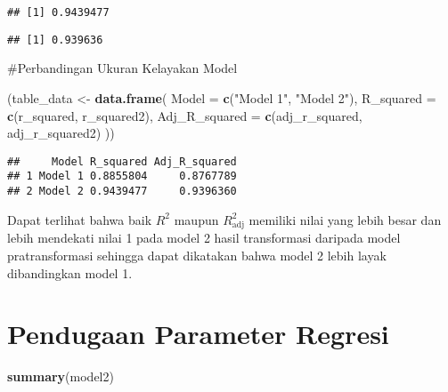 \documentclass[
]{article}
\newenvironment{Shaded}{\begin{snugshade}}{\end{snugshade}}
\newcommand{\AttributeTok}[1]{\textcolor[rgb]{0.13,0.29,0.53}{#1}}
\newcommand{\FunctionTok}[1]{\textcolor[rgb]{0.13,0.29,0.53}{\textbf{#1}}}
\newcommand{\NormalTok}[1]{#1}
\newcommand{\OtherTok}[1]{\textcolor[rgb]{0.56,0.35,0.01}{#1}}
\newcommand{\SpecialCharTok}[1]{\textcolor[rgb]{0.81,0.36,0.00}{\textbf{#1}}}
\newcommand{\StringTok}[1]{\textcolor[rgb]{0.31,0.60,0.02}{#1}}
\begin{document}
\begin{verbatim}
## [1] 0.9439477
\end{verbatim}

\begin{Shaded}
\end{Shaded}

\begin{verbatim}
## [1] 0.939636
\end{verbatim}

\#Perbandingan Ukuran Kelayakan Model

\begin{Shaded}
\begin{Highlighting}[]
\NormalTok{(table\_data }\OtherTok{\textless{}{-}} \FunctionTok{data.frame}\NormalTok{(}
  \AttributeTok{Model =} \FunctionTok{c}\NormalTok{(}\StringTok{"Model 1"}\NormalTok{, }\StringTok{"Model 2"}\NormalTok{),}
  \AttributeTok{R\_squared =} \FunctionTok{c}\NormalTok{(r\_squared, r\_squared2),}
  \AttributeTok{Adj\_R\_squared =} \FunctionTok{c}\NormalTok{(adj\_r\_squared, adj\_r\_squared2)}
\NormalTok{))}
\end{Highlighting}
\end{Shaded}

\begin{verbatim}
##     Model R_squared Adj_R_squared
## 1 Model 1 0.8855804     0.8767789
## 2 Model 2 0.9439477     0.9396360
\end{verbatim}

Dapat terlihat bahwa baik \(R^2\) maupun \(R^2_\text{adj}\) memiliki
nilai yang lebih besar dan lebih mendekati nilai 1 pada model 2 hasil
transformasi daripada model pratransformasi sehingga dapat dikatakan
bahwa model 2 lebih layak dibandingkan model 1.

\hypertarget{pendugaan-parameter-regresi}{%
\section{Pendugaan Parameter
Regresi}\label{pendugaan-parameter-regresi}}

\begin{Shaded}
\begin{Highlighting}[]
\FunctionTok{summary}\NormalTok{(model2)}
\end{Highlighting}
\end{Shaded}
\end{document}
